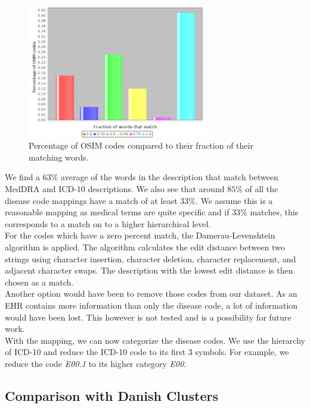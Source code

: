 \begin{figure}[!htb]
	\centering
	\includegraphics[width=0.7\textwidth]{mappingStats.jpeg}
	\caption{Percentage of OSIM codes compared to their fraction of their matching words.}
	\label{fig:mappingStats}
\end{figure}

We find a $63$\% average of the words in the description that match between MedDRA and ICD-10 descriptions. We also see that around $85$\% of all the disease code mappings have a match of at least $33$\%. We assume this is a reasonable mapping as medical terms are quite specific and if $33$\% matches, this corresponds to a match on to a higher hierarchical level. \\
For the codes which have a zero percent match, the Damerau-Levenshtein algorithm \cite{edit:article} is applied. The algorithm calculates the edit distance between two strings using character insertion, character deletion, character replacement, and adjacent character swaps. The description with the lowest edit distance is then chosen as a match. \\
Another option would have been to remove those codes from our dataset. As an EHR contains more information than only the disease code, a lot of information would have been lost. This however is not tested and is a possibility for future work. \\

With the mapping, we can now categorize the disease codes. We use the hierarchy of ICD-10 and reduce the ICD-10 code to its first $3$ symbols. For example, we reduce the code \textit{E00.1} to its higher category \textit{E00}.


\subsection{Comparison with Danish Clusters}
\label{sec:clusterExp}

